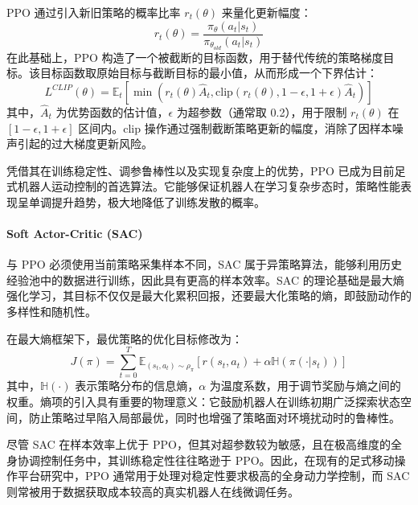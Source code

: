 PPO 通过引入新旧策略的概率比率 $r_t(\theta)$ 来量化更新幅度：
\begin{equation}
    r_t(\theta) = \frac{\pi_\theta(a_t | s_t)}{\pi_{\theta_{old}}(a_t | s_t)}
\end{equation}
在此基础上，PPO 构造了一个被截断的目标函数，用于替代传统的策略梯度目标。该目标函数取原始目标与截断目标的最小值，从而形成一个下界估计：
\begin{equation}
    L^{CLIP}(\theta) = \mathbb{E}_t \left[ \min \left( r_t(\theta) \hat{A}_t, \text{clip}(r_t(\theta), 1-\epsilon, 1+\epsilon) \hat{A}_t \right) \right]
\end{equation}
其中，$\hat{A}_t$ 为优势函数的估计值，$\epsilon$ 为超参数（通常取 0.2），用于限制 $r_t(\theta)$ 在 $[1-\epsilon, 1+\epsilon]$ 区间内。$\text{clip}$ 操作通过强制截断策略更新的幅度，消除了因样本噪声引起的过大梯度更新风险。

凭借其在训练稳定性、调参鲁棒性以及实现复杂度上的优势，PPO 已成为目前足式机器人运动控制的首选算法。它能够保证机器人在学习复杂步态时，策略性能表现呈单调提升趋势，极大地降低了训练发散的概率。

\paragraph{Soft Actor-Critic (SAC)}

与 PPO 必须使用当前策略采集样本不同，SAC 属于异策略算法，能够利用历史经验池中的数据进行训练，因此具有更高的样本效率。SAC 的理论基础是最大熵强化学习\cite{haarnoja2017reinforcementlearningdeepenergybased, haarnoja2018softactorcriticoffpolicymaximum, haarnoja2019softactorcriticalgorithmsapplications}，其目标不仅仅是最大化累积回报，还要最大化策略的熵，即鼓励动作的多样性和随机性。

在最大熵框架下，最优策略的优化目标修改为：
\begin{equation}
    J(\pi) = \sum_{t=0}^{T} \mathbb{E}_{(s_t, a_t) \sim \rho_\pi} \left[ r(s_t, a_t) + \alpha \mathbb{H}(\pi(\cdot | s_t)) \right]
\end{equation}
其中，$\mathbb{H}(\cdot)$ 表示策略分布的信息熵，$\alpha$ 为温度系数，用于调节奖励与熵之间的权重。熵项的引入具有重要的物理意义：它鼓励机器人在训练初期广泛探索状态空间，防止策略过早陷入局部最优，同时也增强了策略面对环境扰动时的鲁棒性。

尽管 SAC 在样本效率上优于 PPO，但其对超参数较为敏感，且在极高维度的全身协调控制任务中，其训练稳定性往往略逊于 PPO。因此，在现有的足式移动操作平台研究中，PPO 通常用于处理对稳定性要求极高的全身动力学控制，而 SAC 则常被用于数据获取成本较高的真实机器人在线微调任务。

